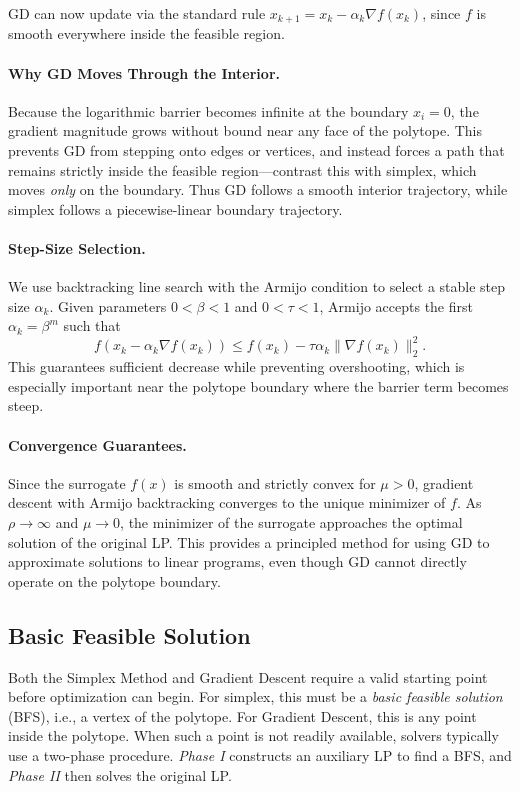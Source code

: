\documentclass[11pt]{article}
\begin{document}
GD can now update via the standard rule \(x_{k+1} = x_k - \alpha_k \nabla f(x_k)\),
since \(f\) is smooth everywhere inside the feasible region.

\paragraph{Why GD Moves Through the Interior.}
Because the logarithmic barrier becomes infinite at the boundary \(x_i = 0\),
the gradient magnitude grows without bound near any face of the polytope.  
This prevents GD from stepping onto edges or vertices, and instead forces a path that 
remains strictly inside the feasible region—contrast this with simplex, which moves 
\emph{only} on the boundary.  
Thus GD follows a smooth interior trajectory, while simplex follows a piecewise-linear
boundary trajectory.

\paragraph{Step-Size Selection.}
We use backtracking line search with the Armijo condition to select a stable step size 
\(\alpha_k\).  
Given parameters \(0 < \beta < 1\) and \(0 < \tau < 1\), Armijo accepts the first 
\(\alpha_k = \beta^m\) such that
\[
    f(x_k - \alpha_k \nabla f(x_k))
    \le
    f(x_k) - \tau \alpha_k \|\nabla f(x_k)\|_2^2.
\]
This guarantees sufficient decrease while preventing overshooting, which is especially 
important near the polytope boundary where the barrier term becomes steep.

\paragraph{Convergence Guarantees.}
Since the surrogate \(f(x)\) is smooth and strictly convex for \(\mu > 0\),
gradient descent with Armijo backtracking converges to the unique minimizer of \(f\).  
As \(\rho \to \infty\) and \(\mu \to 0\), the minimizer of the surrogate approaches the optimal 
solution of the original LP.  
This provides a principled method for using GD to approximate solutions to linear programs,
even though GD cannot directly operate on the polytope boundary.

\subsection{Basic Feasible Solution}



Both the Simplex Method and Gradient Descent require a valid starting point before optimization can begin. 
For simplex, this must be a \emph{basic feasible solution} (BFS), i.e., a vertex of the polytope. For Gradient Descent, this is any point inside the polytope. 
When such a point is not readily available, solvers typically use a two-phase procedure. 
\emph{Phase I} constructs an auxiliary LP to find a BFS, and \emph{Phase II} then solves the original LP.
\end{document}
